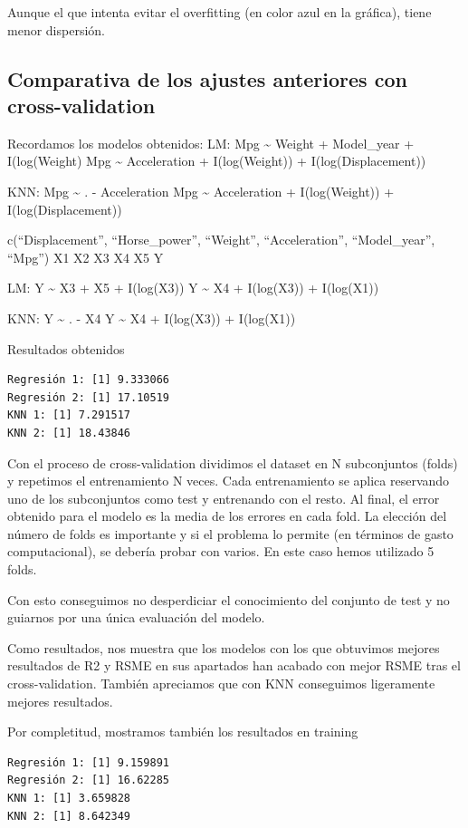 Aunque el que intenta evitar el overfitting (en color azul en la gráfica), tiene menor dispersión.

\subsection{Comparativa de los ajustes anteriores con cross-validation}

Recordamos los modelos obtenidos: LM: Mpg \textasciitilde{} Weight +
Model\_year + I(log(Weight) Mpg \textasciitilde{} Acceleration +
I(log(Weight)) + I(log(Displacement))

KNN: Mpg \textasciitilde{} . - Acceleration Mpg \textasciitilde{}
Acceleration + I(log(Weight)) + I(log(Displacement))

c(``Displacement'', ``Horse\_power'', ``Weight'', ``Acceleration'',
``Model\_year'', ``Mpg'') X1 X2 X3 X4 X5 Y

LM: Y \textasciitilde{} X3 + X5 + I(log(X3)) Y \textasciitilde{} X4 +
I(log(X3)) + I(log(X1))

KNN: Y \textasciitilde{} . - X4 Y \textasciitilde{} X4 + I(log(X3)) +
I(log(X1))

Resultados obtenidos
\begin{verbatim}
Regresión 1: [1] 9.333066
Regresión 2: [1] 17.10519
KNN 1: [1] 7.291517
KNN 2: [1] 18.43846
\end{verbatim}

Con el proceso de cross-validation dividimos el dataset en N subconjuntos (folds) y repetimos el entrenamiento N veces. Cada entrenamiento se aplica reservando uno de los subconjuntos como test y entrenando con el resto. Al final, el error obtenido para el modelo es la media de los errores en cada fold. La elección del número de folds es importante y si el problema lo permite (en términos de gasto computacional), se debería probar con varios. En este caso hemos utilizado 5 folds.

Con esto conseguimos no desperdiciar el conocimiento del conjunto de test y no guiarnos por una única evaluación del modelo.

Como resultados, nos muestra que los modelos con los que obtuvimos mejores resultados de R2 y RSME en sus apartados han acabado con mejor RSME tras el cross-validation. También apreciamos que con KNN conseguimos ligeramente mejores resultados.

Por completitud, mostramos también los resultados en training
\begin{verbatim}
Regresión 1: [1] 9.159891
Regresión 2: [1] 16.62285
KNN 1: [1] 3.659828
KNN 2: [1] 8.642349
\end{verbatim}

